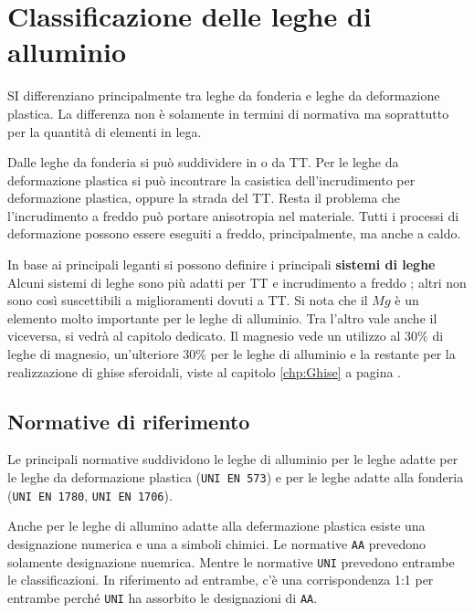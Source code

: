 \section{Classificazione delle leghe di alluminio}
SI differenziano principalmente tra leghe da fonderia e leghe da deformazione plastica.
La differenza non è solamente in termini di normativa ma soprattutto per la quantità di elementi in lega.


Dalle leghe da fonderia si può suddividere in  o da \ac{TT}.
Per le leghe da deformazione plastica si può incontrare la casistica dell'incrudimento per deformazione plastica, oppure la strada del \ac{TT}.
Resta il problema che l'incrudimento a freddo può portare anisotropia nel materiale. Tutti i processi di deformazione possono essere eseguiti a freddo, principalmente, ma anche a caldo.

In base ai principali leganti si possono definire i principali \textbf{sistemi di leghe}
Alcuni sistemi di leghe sono più adatti per \ac{TT} e incrudimento a freddo ; altri non sono così suscettibili a miglioramenti dovuti a \ac{TT}.
Si nota che il $Mg$ è un elemento molto importante per le leghe di alluminio. Tra l'altro vale anche il viceversa, si vedrà al capitolo dedicato\todo{\\Riferimento}.
Il magnesio vede un utilizzo al $30\%$ di leghe di magnesio, un'ulteriore $30\%$ per le leghe di alluminio e la restante per la realizzazione di ghise sferoidali, viste al capitolo \ref{chp:Ghise} a pagina \pageref{chp:Ghise}.

\subsection{Normative di riferimento}
Le principali normative suddividono le leghe di alluminio per le leghe adatte per le leghe da deformazione plastica (\texttt{UNI EN 573}) e per le leghe adatte alla fonderia (\texttt{UNI EN 1780}, \texttt{UNI EN 1706}).

Anche per le leghe di allumino adatte alla defermazione plastica esiste una designazione numerica e una a simboli chimici.
Le normative \texttt{AA} prevedono solamente designazione nuemrica. Mentre le normative \texttt{UNI} prevedono entrambe le classificazioni.
In riferimento ad entrambe, c'è una corrispondenza 1:1 per entrambe perché \texttt{UNI} ha assorbito le designazioni di \texttt{AA}.

